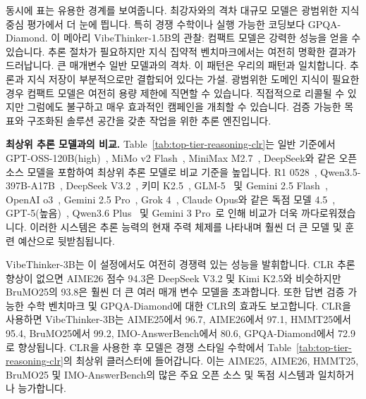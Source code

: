 \documentclass{article}
\begin{document}
동시에 표는 유용한 경계를 보여줍니다. 최강자와의 격차
대규모 모델은 광범위한 지식 중심 평가에서 더 눈에 띕니다. 특히
경쟁 수학이나 실행 가능한 코딩보다 GPQA-Diamond. 이 메아리
VibeThinker-1.5B의 관찰: 컴팩트 모델은 강력한 성능을 얻을 수 있습니다.
추론 절차가 필요하지만 지식 집약적 벤치마크에서는 여전히 명확한 결과가 드러납니다.
큰 매개변수 일반 모델과의 격차. 이 패턴은 우리의 패턴과 일치합니다.
추론과 지식 저장이 부분적으로만 결합되어 있다는 가설.
광범위한 도메인 지식이 필요한 경우 컴팩트 모델은 여전히 ​​용량 제한에 직면할 수 있습니다.
직접적으로 리콜될 수 있지만 그럼에도 불구하고 매우 효과적인 캠페인을 개최할 수 있습니다.
검증 가능한 목표와 구조화된 솔루션 공간을 갖춘 작업을 위한 추론 엔진입니다.



\textbf{최상위 추론 모델과의 비교.}
Table~\ref{tab:top-tier-reasoning-clr}는 일반 기준에서 GPT-OSS-120B(high)~\cite{agarwal2025gptoss}, MiMo v2 Flash~\cite{xiao2026mimov2flash}, MiniMax M2.7~\cite{chen2026minimaxM2.7}, DeepSeek와 같은 오픈 소스 모델을 포함하여 최상위 추론 모델로 비교 기준을 높입니다. R1 0528~\cite{deepseekai2025deepseekr1R10528}, Qwen3.5-397B-A17B~\cite{qwen3.5}, DeepSeek V3.2~\cite{liu2025deepseekv3.2}, 키미 K2.5~\cite{team2026kimik2.5}, GLM-5~\cite{zeng2026glm5} 및 Gemini 2.5 Flash~\cite{comanici2025gemini2.5proflash}, OpenAI o3~\cite{openai2025o3o4mini}, Gemini 2.5 Pro~\cite{comanici2025gemini2.5proflash}, Grok 4~\cite{xai2025grok4}, Claude Opus와 같은 독점 모델 4.5~\cite{anthropic2025claudeopus45systemcard}, GPT-5(높음)~\cite{singh2025gpt5gpt5nano}, Qwen3.6 Plus~\cite{qwen36plus} 및 Gemini 3 Pro~\cite{googledeepmind2026gemini3pro}로 인해 비교가 더욱 까다로워졌습니다. 이러한 시스템은 추론 능력의 현재 주력 체제를 나타내며 훨씬 더 큰 모델 및 훈련 예산으로 뒷받침됩니다.

VibeThinker-3B는 이 설정에서도 여전히 경쟁력 있는 성능을 발휘합니다. CLR 추론 향상이 없으면 AIME26 점수 94.3은 DeepSeek V3.2 및 Kimi K2.5와 비슷하지만 BruMO25의 93.8은 훨씬 더 큰 여러 매개 변수 모델을 초과합니다. 또한 답변 검증 가능한 수학 벤치마크 및 GPQA-Diamond에 대한 CLR의 효과도 보고합니다. CLR을 사용하면 VibeThinker-3B는 AIME25에서 96.7, AIME26에서 97.1, HMMT25에서 95.4, BruMO25에서 99.2, IMO-AnswerBench에서 80.6, GPQA-Diamond에서 72.9로 향상됩니다. CLR을 사용한 후 모델은 경쟁 스타일 수학에서 Table~\ref{tab:top-tier-reasoning-clr}의 최상위 클러스터에 들어갑니다. 이는 AIME25, AIME26, HMMT25, BruMO25 및 IMO-AnswerBench의 많은 주요 오픈 소스 및 독점 시스템과 일치하거나 능가합니다.
\end{document}
